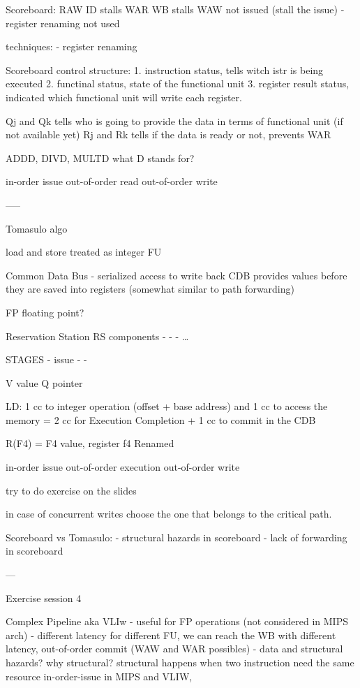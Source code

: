 Scoreboard:
RAW ID stalls
WAR WB stalls
WAW not issued (stall the issue) - register renaming not used

techniques:
- register renaming

Scoreboard control structure:
1. instruction status, tells witch istr is being executed
2. functinal status, state of the functional unit
3. register result status, indicated which functional unit will write each register.

Qj and Qk tells who is going to provide the data in terms of functional unit (if not available yet)
Rj and Rk tells if the data is ready or not, prevents WAR

ADDD, DIVD, MULTD what D stands for?

in-order issue
out-of-order read
out-of-order write

-----

Tomasulo algo

load and store treated as integer FU

Common Data Bus - serialized access to write back
CDB provides values before they are saved into registers (somewhat similar to path forwarding)

FP floating point?

Reservation Station RS components
-
-
-
\ldots

STAGES
- issue
-
-

V value
Q pointer

LD: 1 cc to integer operation (offset + base address) and 1 cc to access the memory = 2 cc for Execution Completion + 1 cc to commit in the CDB

R(F4) = F4 value, register f4 Renamed

in-order issue
out-of-order execution
out-of-order write

try to do exercise on the slides

in case of concurrent writes choose the one that belongs to the critical path.

Scoreboard vs Tomasulo:
- structural hazards in scoreboard
- lack of forwarding in scoreboard


---

Exercise session 4

Complex Pipeline aka VLIw
- useful for FP operations (not considered in MIPS arch)
- different latency for different FU, we can reach the WB with different latency, out-of-order commit (WAW and WAR possibles)
- data and structural hazards? why structural? structural happens when two instruction need the same resource
in-order-issue in MIPS and VLIW,

